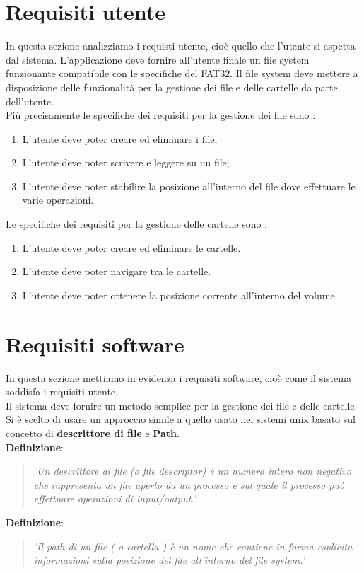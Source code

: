\section{Requisiti utente}
      In questa sezione analizziamo i requisti utente, cioè quello che l'utente si aspetta dal sistema. 
      L'applicazione deve fornire all'utente finale un file system funzionante compatibile con le specifiche del FAT32. Il file system deve mettere a disposizione delle funzionalità per la gestione dei file e delle cartelle da parte dell'utente.\\
      Più precisamente le specifiche dei requisiti per la gestione dei file sono : 
	\begin{enumerate}
	 \item L'utente deve poter creare ed eliminare i file;
	 \item L'utente deve poter scrivere e leggere  su un file;
	 \item L'utente deve poter stabilire la posizione all'interno del file dove effettuare le varie operazioni.
	\end{enumerate}
	
	Le specifiche dei requisiti per la gestione delle cartelle sono : 
	\begin{enumerate}
	 \item L'utente deve poter creare ed eliminare le cartelle.
	 \item L'utente deve poter navigare tra le cartelle.
	 \item L'utente deve poter ottenere la posizione corrente all'interno del volume. 
	\end{enumerate}
    
\section{Requisiti software}
\label{sez:Req}
    In questa sezione mettiamo in evidenza i requisiti software, cioè come il sistema soddisfa i requisiti utente.\\
    Il sistema deve fornire un metodo semplice per la gestione dei file e delle cartelle.
    Si è scelto di usare un approccio simile a quello usato nei sistemi unix basato sul concetto di\textbf{ descrittore di file} e \textbf{Path}. \\
      {\bf Definizione}: 
		\begin{quote}
		\textit{'Un descrittore di file (o file descriptor) è un numero intero non negativo che rappresenta un file  aperto da un processo e sul quale il processo può effettuare operazioni di input/output.'}
		\end{quote}
       {\bf Definizione}: 
		\begin{quote}
		\textit{'Il path di un file ( o cartella ) è un nome che contiene in forma esplicita informazioni sulla posizione del file all'interno del file system.'}
		\end{quote}

